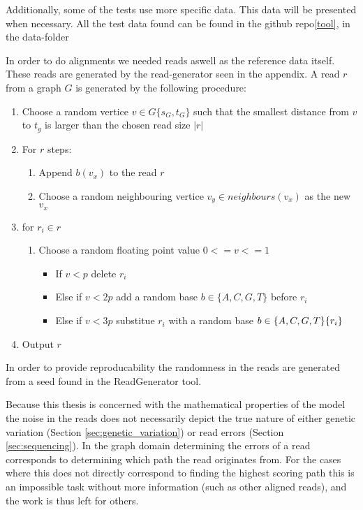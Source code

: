 \documentclass[thesis.tex]{subfiles}
\begin{document}
Additionally, some of the tests use more specific data. This data will be presented when necessary. All the test data found can be found in the github repo\ref{tool}, in the data-folder\\
\par\noindent
In order to do alignments we needed reads aswell as the reference data itself. These reads are generated by the read-generator seen in the appendix. A read $r$ from a graph $G$ is generated by the following procedure:
\begin{enumerate}
  \item Choose a random vertice $v \in G\{s_G, t_G\}$ such that the smallest distance from $v$ to $t_g$ is larger than the chosen read size $|r|$
  \item For $r$ steps:
  \begin{enumerate}
    \item Append $b(v_x)$ to the read $r$
    \item Choose a random neighbouring vertice $v_y \in neighbours(v_x)$ as the new $v_x$
  \end{enumerate}
  \item for $r_i \in r$
  \begin{enumerate}
    \item Choose a random floating point value $0<=v<=1$
    \begin{itemize}
      \item If $v<p$ delete $r_i$
      \item Else if $v<2p$ add a random base $b \in \{A, C, G, T\}$ before $r_i$
      \item Else if $v<3p$ substitue $r_i$ with a random base $b \in \{A, C, G, T\} \\ \{r_i\}$
    \end{itemize}
  \end{enumerate}
  \item Output $r$
\end{enumerate}
In order to provide reproducability the randomness in the reads are generated from a seed found in the ReadGenerator tool.\\
\par\noindent
Because this thesis is concerned with the mathematical properties of the model the noise in the reads does not necessarily depict the true nature of either genetic variation (Section \ref{sec:genetic_variation}) or read errors (Section \ref{sec:sequencing}). In the graph domain determining the errors of a read corresponds to determining which path the read originates from. For the cases where this does not directly correspond to finding the highest scoring path this is an impossible task without more information (such as other aligned reads), and the work is thus left for others. 
\end{document}
